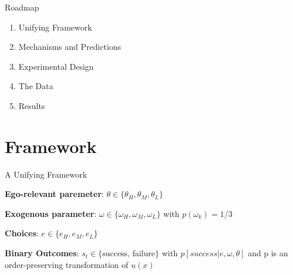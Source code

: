 \documentclass[aspectratio=169]{beamer}
\begin{document}
\begin{frame}{Roadmap}
    \begin{enumerate}
        \item Unifying Framework\\
        \bigskip
        \item Mechanisms and Predictions\\
        \bigskip
        \item Experimental Design\\
        \bigskip
        \item The Data\\
        \bigskip
        \item Results\\
    \end{enumerate}
\end{frame}

\section*{Framework}

\begin{frame}{A Unifying Framework}

\textbf{Ego-relevant paremeter}: $\theta \in \{\theta_H, \theta_M, \theta_L\}$\\
\bigskip

\textbf{Exogenous parameter}: $\omega \in \{\omega_H, \omega_M, \omega_L\}$
with $p(\omega_k)=1/3$ \\
\bigskip

\textbf{Choices}: $e \in \{e_H, e_M, e_L\}$\\
\bigskip

\textbf{Binary Outcomes}: $s_t \in\{\text{success, failure}\}$ with  $p\left[success|e, \omega, \theta\right]$ and p is an order-preserving transformation of $u(x)$


\end{frame}
\end{document}
